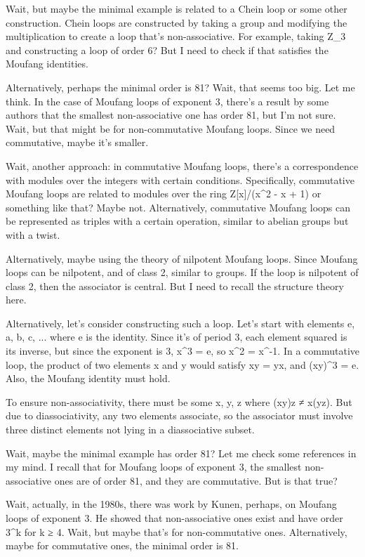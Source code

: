 \documentclass[12p]{article}
\newcounter{reasoningcounter}
\newenvironment{reasoning}[1][]
{\refstepcounter{reasoningcounter}%
\begin{tcolorbox}[
    title=Reasoning \thereasoningcounter: #1,
    colback=white, %
    colframe=gray,
    coltext=black, %
    fonttitle=\bfseries\normalsize,
    top=2mm,
    bottom=2mm,
    enlarge top initially by=5mm
]
\small
}
{\end{tcolorbox}}
\begin{document}
\begin{reasoning}
Wait, but maybe the minimal example is related to a Chein loop or some other construction. Chein loops are constructed by taking a group and modifying the multiplication to create a loop that's non-associative. For example, taking Z_3 and constructing a loop of order 6? But I need to check if that satisfies the Moufang identities.

Alternatively, perhaps the minimal order is 81? Wait, that seems too big. Let me think. In the case of Moufang loops of exponent 3, there's a result by some authors that the smallest non-associative one has order 81, but I'm not sure. Wait, but that might be for non-commutative Moufang loops. Since we need commutative, maybe it's smaller.

Wait, another approach: in commutative Moufang loops, there's a correspondence with modules over the integers with certain conditions. Specifically, commutative Moufang loops are related to modules over the ring Z[x]/(x^2 - x + 1) or something like that? Maybe not. Alternatively, commutative Moufang loops can be represented as triples with a certain operation, similar to abelian groups but with a twist.

Alternatively, maybe using the theory of nilpotent Moufang loops. Since Moufang loops can be nilpotent, and of class 2, similar to groups. If the loop is nilpotent of class 2, then the associator is central. But I need to recall the structure theory here.

Alternatively, let's consider constructing such a loop. Let's start with elements e, a, b, c, ... where e is the identity. Since it's of period 3, each element squared is its inverse, but since the exponent is 3, x^3 = e, so x^2 = x^{-1}. In a commutative loop, the product of two elements x and y would satisfy xy = yx, and (xy)^3 = e. Also, the Moufang identity must hold.

To ensure non-associativity, there must be some x, y, z where (xy)z ≠ x(yz). But due to diassociativity, any two elements associate, so the associator must involve three distinct elements not lying in a diassociative subset.

Wait, maybe the minimal example has order 81? Let me check some references in my mind. I recall that for Moufang loops of exponent 3, the smallest non-associative ones are of order 81, and they are commutative. But is that true?

Wait, actually, in the 1980s, there was work by Kunen, perhaps, on Moufang loops of exponent 3. He showed that non-associative ones exist and have order 3^k for k ≥ 4. Wait, but maybe that's for non-commutative ones. Alternatively, maybe for commutative ones, the minimal order is 81.


\end{reasoning}
\end{document}
